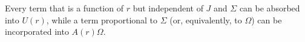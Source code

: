 Every term that is a function of $r$ but independent of $J$ and $\Sigma$ can be absorbed into $U(r)$, while a term proportional to $\Sigma$ (or, equivalently, to $\Omega$) can be incorporated into $A(r)\Omega$.
